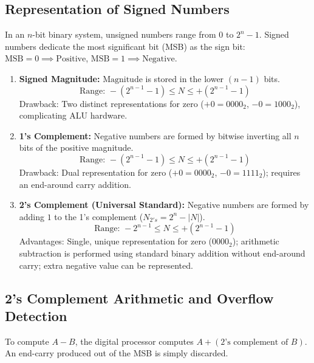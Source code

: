\documentclass[12pt,a4paper]{article}
\begin{document}
\subsection{Representation of Signed Numbers}
In an $n$-bit binary system, unsigned numbers range from $0$ to $2^n - 1$. Signed numbers dedicate the most significant bit (MSB) as the sign bit: $\text{MSB} = 0 \implies \text{Positive}$, $\text{MSB} = 1 \implies \text{Negative}$.

\begin{tcolorbox}[defbox, title={\textbf{Three Signed Number Representations ($n$-bit)}}]
\begin{enumerate}[label=\arabic*., leftmargin=*]
  \item \textbf{Signed Magnitude:}
    $\text{Magnitude}$ is stored in the lower $(n-1)$ bits.
    \begin{equation}
      \text{Range: } -(2^{n-1}-1) \le N \le +(2^{n-1}-1)
    \end{equation}
    Drawback: Two distinct representations for zero ($+0 = 0000_2$, $-0 = 1000_2$), complicating ALU hardware.
  \item \textbf{1's Complement:}
    Negative numbers are formed by bitwise inverting all $n$ bits of the positive magnitude.
    \begin{equation}
      \text{Range: } -(2^{n-1}-1) \le N \le +(2^{n-1}-1)
    \end{equation}
    Drawback: Dual representation for zero ($+0 = 0000_2$, $-0 = 1111_2$); requires an end-around carry addition.
  \item \textbf{2's Complement (Universal Standard):}
    Negative numbers are formed by adding $1$ to the 1's complement ($N_{2's} = 2^n - |N|$).
    \begin{equation}
      \text{Range: } -2^{n-1} \le N \le +(2^{n-1}-1)
    \end{equation}
    Advantages: Single, unique representation for zero ($0000_2$); arithmetic subtraction is performed using standard binary addition without end-around carry; extra negative value can be represented.
\end{enumerate}
\end{tcolorbox}

\subsection{2's Complement Arithmetic and Overflow Detection}
To compute $A - B$, the digital processor computes $A + (\text{2's complement of } B)$. An end-carry produced out of the MSB is simply discarded.
\end{document}
